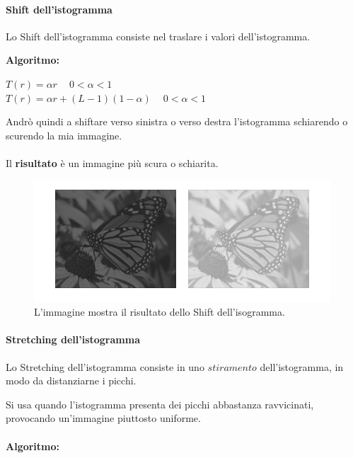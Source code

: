 \paragraph{Shift dell'istogramma}

\begin{definition}
    Lo Shift dell'istogramma consiste nel traslare i valori dell’istogramma.
\end{definition}
\textbf{Algoritmo:}

\begin{center}
    $T(r) = \alpha r$  $ \ \ \ \  0 < \alpha < 1$
    \\
    $T(r) = \alpha r + (L-1)(1-\alpha)$ $\ \ \ \ 0<\alpha<1$
\end{center}

Andrò quindi a shiftare verso sinistra o verso destra l'istogramma schiarendo o scurendo la mia immagine.
\\\\
Il \textbf{risultato} è un immagine più scura o schiarita.

\begin{figure}[H]
    \centering
    \includegraphics[width=\linewidth, keepaspectratio]{capitoli/immagini/imgs/shift-isto.png}
    \caption{L'immagine mostra il risultato dello Shift dell'isogramma.}
\end{figure}

\paragraph{Stretching dell'istogramma}

\begin{definition}
    Lo Stretching dell'istogramma consiste in uno $stiramento$ dell'istogramma, in modo da distanziarne i picchi.
\end{definition}

Si usa quando l'istogramma presenta dei picchi abbastanza ravvicinati, provocando un'immagine
piuttosto uniforme.
\\\\
\textbf{Algoritmo:}

